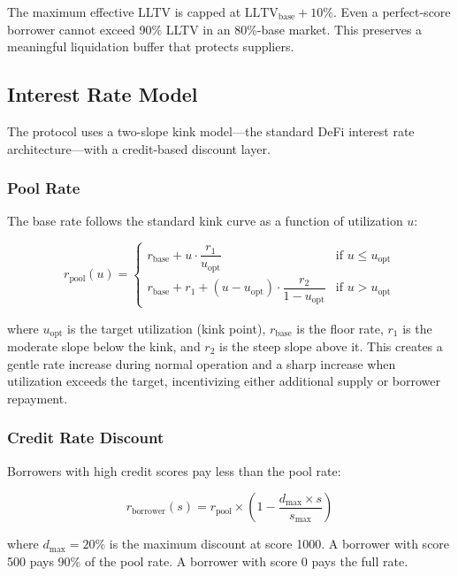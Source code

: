\documentclass[11pt,a4paper]{article}
\begin{document}
The maximum effective LLTV is capped at $\text{LLTV}_{\text{base}} + 10\%$. Even a perfect-score borrower cannot exceed 90\% LLTV in an 80\%-base market. This preserves a meaningful liquidation buffer that protects suppliers.

\subsection{Interest Rate Model}

The protocol uses a two-slope kink model---the standard DeFi interest rate architecture---with a credit-based discount layer.

\subsubsection{Pool Rate}

The base rate follows the standard kink curve as a function of utilization $u$:

\begin{equation}
r_{\text{pool}}(u) = \begin{cases}
  r_{\text{base}} + u \cdot \dfrac{r_1}{u_{\text{opt}}} & \text{if } u \leq u_{\text{opt}} \\[8pt]
  r_{\text{base}} + r_1 + (u - u_{\text{opt}}) \cdot \dfrac{r_2}{1 - u_{\text{opt}}} & \text{if } u > u_{\text{opt}}
\end{cases}
\end{equation}

where $u_{\text{opt}}$ is the target utilization (kink point), $r_{\text{base}}$ is the floor rate, $r_1$ is the moderate slope below the kink, and $r_2$ is the steep slope above it. This creates a gentle rate increase during normal operation and a sharp increase when utilization exceeds the target, incentivizing either additional supply or borrower repayment.

\subsubsection{Credit Rate Discount}

Borrowers with high credit scores pay less than the pool rate:

\begin{equation}
r_{\text{borrower}}(s) = r_{\text{pool}} \times \left(1 - \frac{d_{\max} \times s}{s_{\max}}\right)
\end{equation}

where $d_{\max} = 20\%$ is the maximum discount at score 1000. A borrower with score 500 pays 90\% of the pool rate. A borrower with score 0 pays the full rate.
\end{document}
